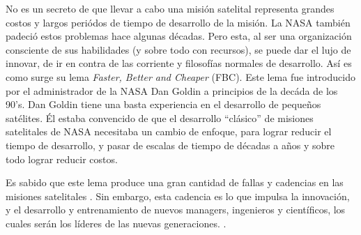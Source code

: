 No es un secreto de que llevar a cabo una misión satelital representa grandes costos
y largos periódos de tiempo de desarrollo de la misión.
La NASA también padeció estos problemas hace algunas décadas.
Pero esta, al ser una organización consciente de sus habilidades (y sobre todo con recursos),
se puede dar el lujo de innovar, de ir en contra de las corriente y filosofías normales de desarrollo.
Así es como surge su lema \textit{Faster, Better and Cheaper} (FBC).
Este lema fue introducido por el administrador de la NASA Dan Goldin a
principios de la decáda de los 90's. Dan Goldin tiene una basta experiencia en
el desarrollo de pequeños satélites. Él estaba convencido de que el desarrollo
``clásico'' de misiones satelitales de NASA necesitaba un cambio de enfoque,
para lograr reducir el tiempo de desarrollo, y pasar de escalas de tiempo de
décadas a años y sobre todo lograr reducir costos.

Es sabido que este lema produce una gran cantidad de fallas y
cadencias en las misiones satelitales \citep{Paxton07}. Sin embargo,
esta cadencia es lo que impulsa la innovación, y el desarrollo y entrenamiento de nuevos
managers, ingenieros y científicos, los cuales serán los líderes de las
nuevas generaciones. \citep{Paxton07}. 

